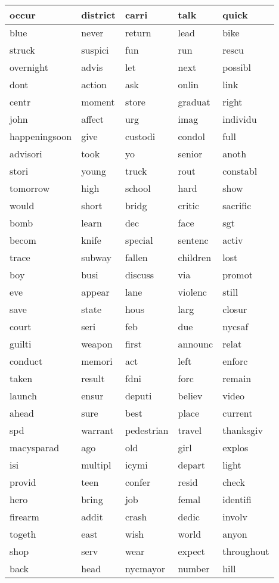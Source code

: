 \begin{longtable}{p{2.5cm}p{2.5cm}p{2.5cm}p{2.5cm}p{2.5cm}}
occur&district&carri&talk&quick\\ \hline 
blue&never&return&lead&bike\\ \hline 
struck&suspici&fun&run&rescu\\ \hline 
overnight&advis&let&next&possibl\\ \hline 
dont&action&ask&onlin&link\\ \hline 
centr&moment&store&graduat&right\\ \hline 
john&affect&urg&imag&individu\\ \hline 
happeningsoon&give&custodi&condol&full\\ \hline 
advisori&took&yo&senior&anoth\\ \hline 
stori&young&truck&rout&constabl\\ \hline 
tomorrow&high&school&hard&show\\ \hline 
would&short&bridg&critic&sacrific\\ \hline 
bomb&learn&dec&face&sgt\\ \hline 
becom&knife&special&sentenc&activ\\ \hline 
trace&subway&fallen&children&lost\\ \hline 
boy&busi&discuss&via&promot\\ \hline 
eve&appear&lane&violenc&still\\ \hline 
save&state&hous&larg&closur\\ \hline 
court&seri&feb&due&nycsaf\\ \hline 
guilti&weapon&first&announc&relat\\ \hline 
conduct&memori&act&left&enforc\\ \hline 
taken&result&fdni&forc&remain\\ \hline 
launch&ensur&deputi&believ&video\\ \hline 
ahead&sure&best&place&current\\ \hline 
spd&warrant&pedestrian&travel&thanksgiv\\ \hline 
macysparad&ago&old&girl&explos\\ \hline 
isi&multipl&icymi&depart&light\\ \hline 
provid&teen&confer&resid&check\\ \hline 
hero&bring&job&femal&identifi\\ \hline 
firearm&addit&crash&dedic&involv\\ \hline 
togeth&east&wish&world&anyon\\ \hline 
shop&serv&wear&expect&throughout\\ \hline 
back&head&nycmayor&number&hill\\ \hline 

\end{longtable}
